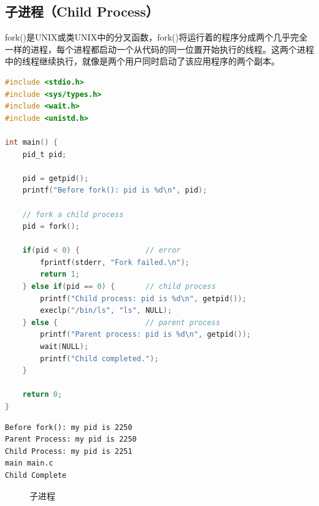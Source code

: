 \vspace{0.5cm}

\subsection{子进程（Child Process）}

fork()是UNIX或类UNIX中的分叉函数，fork()将运行着的程序分成两个几乎完全一样的进程，每个进程都启动一个从代码的同一位置开始执行的线程。这两个进程中的线程继续执行，就像是两个用户同时启动了该应用程序的两个副本。\\


\begin{lstlisting}[language=C]
#include <stdio.h>
#include <sys/types.h>
#include <wait.h>
#include <unistd.h>

int main() {
	pid_t pid;

	pid = getpid();
	printf("Before fork(): pid is %d\n", pid);

	// fork a child process
	pid = fork();

	if(pid < 0) {               // error
		fprintf(stderr, "Fork failed.\n");
		return 1;
	} else if(pid == 0) {       // child process
		printf("Child process: pid is %d\n", getpid());
		execlp("/bin/ls", "ls", NULL);
	} else {                    // parent process
		printf("Parent process: pid is %d\n", getpid());
		wait(NULL);
		printf("Child completed.");
	}
	
	return 0;
}
\end{lstlisting}

\begin{tcolorbox}
    \begin{verbatim}
Before fork(): my pid is 2250
Parent Process: my pid is 2250
Child Process: my pid is 2251
main main.c
Child Complete
	\end{verbatim}
\end{tcolorbox}

\begin{figure}[H]
    \centering
    \caption{子进程}
\end{figure}

